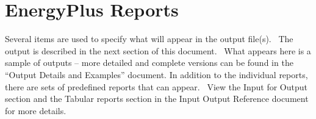 \section{EnergyPlus Reports}\label{energyplus-reports}

Several items are used to specify what will appear in the output file(s).~ The output is described in the next section of this document.~ What appears here is a sample of outputs -- more detailed and complete versions can be found in the ``Output Details and Examples'' document. In addition to the individual reports, there are sets of predefined reports that can appear.~ View the Input for Output section and the Tabular reports section in the Input Output Reference document for more details.

